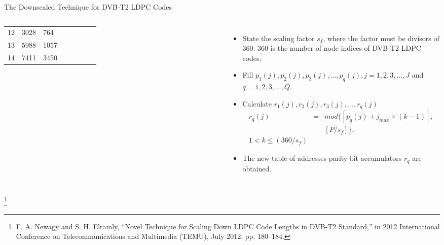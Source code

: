 \documentclass[11pt, aspectratio=169]{beamer}
\newcommand\blfootnote[1]{%
  \begingroup
  \renewcommand\thefootnote{}\footnote{#1}%
  \addtocounter{footnote}{-1}%
  \endgroup
}
\begin{document}
\begin{frame}{The Downscaled Technique for DVB-T2 LDPC Codes}
\begin{columns}
\begin{table}[tb]
\begin{adjustbox}{width=0.8\textwidth , totalheight=\baselineskip,keepaspectratio}
\begin{tabular}{|l|l|l|lllll}
		12                       & 3028                      & 764                       &                           &                           &                           &                           &                           \\ \cline{1-3}
		13                       & 5988                      & 1057                      &                           &                           &                           &                           &                           \\ \cline{1-3}
		14                       & 7411                      & 3450                      &                           &                           &                           &                           &                           \\ \cline{1-3}
	\end{tabular}
	            \end{adjustbox}

\end{table}
\begin{itemize}

\item State the scaling factor $s_f$, where the factor must be divisors of $360$.  $360$ is the number of node indices of DVB-T2 LDPC codes.
\item Fill $p_{1}(j), p_{2}(j), p_{3}(j), \dots, p_{q}(j), j= 1, 2, 3, \dots, J$  and $q= 1, 2, 3, \dots, Q$. 
\item Calculate $r_{1}(j), r_{2}(j), r_{3}(j), \dots, r_{q}(j)$
		  \begin{eqnarray}
r_{q}(j) &=& mod \{ \left [ p_q(j) + j_{max}\times \left ( k-1 \right ) \right ], \nonumber \\  && \left [ P/s_f \right ] \} , \\ 1< k\leq \left ( 360/s_f \right )
		  \end{eqnarray}
\item The new table of addresses parity bit accumulators $r_q$ are obtained.

\end{itemize}
\end{columns}
\blfootnote{\tiny{F. A. Newagy and S. H. Elramly, “Novel Technique for Scaling Down LDPC Code Lengths in DVB-T2 Standard,” in 2012 International Conference on Telecommunications and Multimedia (TEMU), July 2012, pp. 180–184.}}
\end{frame}
\end{document}
